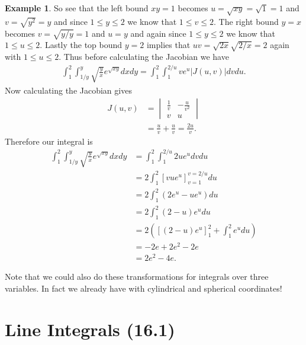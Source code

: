 \documentclass[12pt, letter]{article}
\theoremstyle{plain}
\numberwithin{theorem}{section}
\theoremstyle{definition}
\newtheorem{example}[theorem]{Example}
\begin{document}
\begin{example}
So see that the left bound $xy=1$ becomes $u=\sqrt{xy}=\sqrt{1}=1$ and $v=\sqrt{y^2} = y$ and since $1\leq y \leq 2$ we know that $1\leq v \leq 2$. The right bound $y=x$ becomes $v=\sqrt{y/y} = 1$ and $u=y$ and again since $1\leq y \leq 2$ we know that $1\leq u \leq 2$. Lastly the top bound $y=2$ implies that $uv = \sqrt{2x}\sqrt{2/x} = 2$ again with $1\leq u \leq 2$. Thus before calculating the Jacobian we have
\begin{align*}
\int_1^2 \int_{1/y}^y \sqrt{\frac{y}{x}} e^{\sqrt{xy}} dxdy = \int_1^2 \int_1^{2/u} ve^u |J(u,v)| dv du.
\end{align*}
Now calculating the Jacobian gives
\begin{align*}
J(u,v) &= \begin{vmatrix} \frac{1}{v} & -\frac{u}{v^2} \\ v & u \end{vmatrix}\\
&= \frac{u}{v} + \frac{u}{v} = \frac{2u}{v}.
\end{align*}
Therefore our integral is
\begin{align*}
\int_1^2 \int_{1/y}^y \sqrt{\frac{y}{x}} e^{\sqrt{xy}} dxdy &= \int_1^2 \int_1^{2/u} 2ue^u dv du\\
&= 2 \int_1^2 \left[vue^u\right]_{v=1}^{v=2/u} du\\
&= 2 \int_1^2 (2e^u-ue^u)du\\
&= 2\int_1^2 (2-u)e^udu\\
&=2\left(\left[(2-u)e^u\right]_1^2 + \int_1^2 e^u du\right)\\
&= -2e+2e^2-2e\\
&= 2e^2-4e.
\end{align*}

\end{example}

\bigskip

\hrulefill

\bigskip


Note that we could also do these transformations for integrals over three variables. In fact we already have with cylindrical and spherical coordinates!

\newpage


\section{Line Integrals (16.1)}
\end{document}

